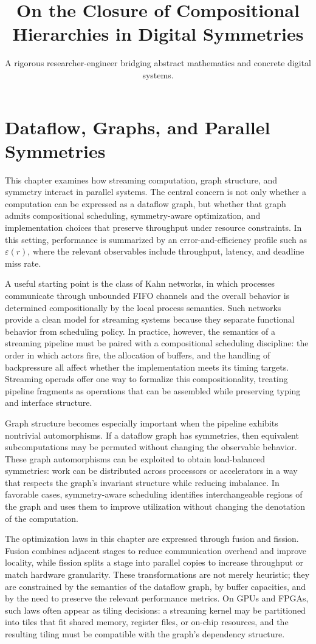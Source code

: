 \documentclass[11pt]{article}
\title{On the Closure of Compositional Hierarchies in Digital Symmetries}
\author{A rigorous researcher-engineer bridging abstract mathematics and concrete digital systems.}
\begin{document}
\section*{Dataflow, Graphs, and Parallel Symmetries}

This chapter examines how streaming computation, graph structure, and symmetry interact in parallel systems. The central concern is not only whether a computation can be expressed as a dataflow graph, but whether that graph admits compositional scheduling, symmetry-aware optimization, and implementation choices that preserve throughput under resource constraints. In this setting, performance is summarized by an error-and-efficiency profile such as \(\varepsilon(r)\), where the relevant observables include throughput, latency, and deadline miss rate.

A useful starting point is the class of Kahn networks, in which processes communicate through unbounded FIFO channels and the overall behavior is determined compositionally by the local process semantics. Such networks provide a clean model for streaming systems because they separate functional behavior from scheduling policy. In practice, however, the semantics of a streaming pipeline must be paired with a compositional scheduling discipline: the order in which actors fire, the allocation of buffers, and the handling of backpressure all affect whether the implementation meets its timing targets. Streaming operads offer one way to formalize this compositionality, treating pipeline fragments as operations that can be assembled while preserving typing and interface structure.

Graph structure becomes especially important when the pipeline exhibits nontrivial automorphisms. If a dataflow graph has symmetries, then equivalent subcomputations may be permuted without changing the observable behavior. These graph automorphisms can be exploited to obtain load-balanced symmetries: work can be distributed across processors or accelerators in a way that respects the graph's invariant structure while reducing imbalance. In favorable cases, symmetry-aware scheduling identifies interchangeable regions of the graph and uses them to improve utilization without changing the denotation of the computation.

The optimization laws in this chapter are expressed through fusion and fission. Fusion combines adjacent stages to reduce communication overhead and improve locality, while fission splits a stage into parallel copies to increase throughput or match hardware granularity. These transformations are not merely heuristic; they are constrained by the semantics of the dataflow graph, by buffer capacities, and by the need to preserve the relevant performance metrics. On GPUs and FPGAs, such laws often appear as tiling decisions: a streaming kernel may be partitioned into tiles that fit shared memory, register files, or on-chip resources, and the resulting tiling must be compatible with the graph's dependency structure.
\end{document}
